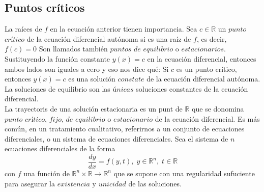 \documentclass[10pt,a4paper,notitlepage]{report}
\begin{document}
\subsection*{Puntos críticos}
La raíces de $f$ en la ecuación anterior tienen importancia. Sea $c \in \mathbb{R}$ un $punto$ $crítico$ de la ecuación diferencial autónoma si es una raíz de $f$, es decir, $f(c) = 0$ Son llamados también $puntos$ $de$ $equilibrio$ o $estacionarios$. \\
Sustituyendo la función constante $y(x) = c$ en la ecuación diferencial, entonces ambos lados son iguales a cero y eso nos dice qué: Si $c$ es un punto crítico, entonces $y(x) = c$ es una solución $constate$ de la ecuación diferencial autónoma. La soluciones de equilibrio son las $únicas$ soluciones constantes de la ecuación diferencial. \\
La trayectoris de una solución estacionaria es un punt de $\mathbb{R}$ que se donomina $punto$ $crítico$, $fijo$, $de$ $equilibrio$ o $estacionario$ de la ecuación diferencial.
Es más común, en un tratamiento cualitativo, referirnos a un conjunto de ecuaciones diferenciales, o un sistema de ecuaciones diferenciales.
Sea el sistema de $n$ ecuaciones diferenciales de la forma
\begin{equation}
\frac{dy}{dx} = f(y, t), \; y \in \mathbb{R}^{n}, \; t \in \mathbb{R}
\end{equation}
con $f$ una función de $\mathbb{R}^{n} \times \mathbb{R} \rightarrow \mathbb{R}^{n}$ que se supone con una regularidad sufuciente para asegurar la $existencia$ y $unicidad$ de las soluciones.
\end{document}
